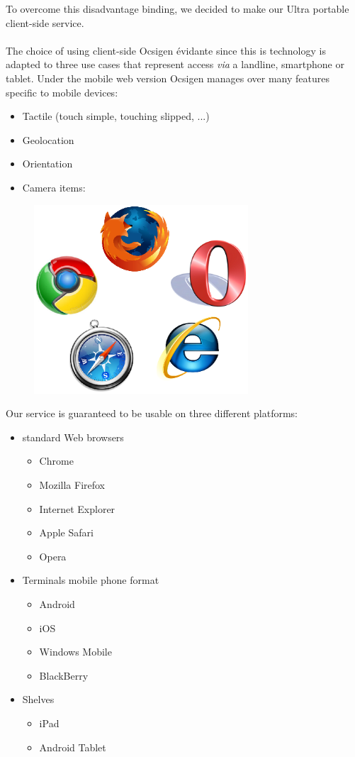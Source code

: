 \documentclass {life-en}
\begin{document}
To overcome this disadvantage binding, we decided to make our
Ultra portable client-side service.\\
\\
The choice of using client-side Ocsigen évidante since this is 
technology is adapted to three use cases that represent access
\textit{via} a landline, smartphone or tablet. Under
the mobile web version Ocsigen manages over many features 
specific to mobile devices:
\begin{itemize}
  \item Tactile (touch simple, touching slipped, ...)
  \item Geolocation
  \item Orientation
  \item Camera
  items:
\end{itemize}

\begin{figure} [H]
  \begin{center}
    \includegraphics [width = 8cm]{img/browsers.png}
  \end{center}
\end{figure}

Our service is guaranteed to be usable on three different platforms:

\begin{itemize}
  \item standard Web browsers
    \begin{itemize}
      \item Chrome
      \item Mozilla Firefox
      \item Internet Explorer
      \item Apple Safari
      \item Opera
    \end{itemize}
  \item Terminals mobile phone format
    \begin{itemize}
      \item Android
      \item iOS
      \item Windows Mobile
      \item BlackBerry
    \end{itemize}
  \item Shelves
    \begin{itemize}
      \item iPad
      \item Android Tablet
    \end{itemize}
\end{itemize}
\end{document}

